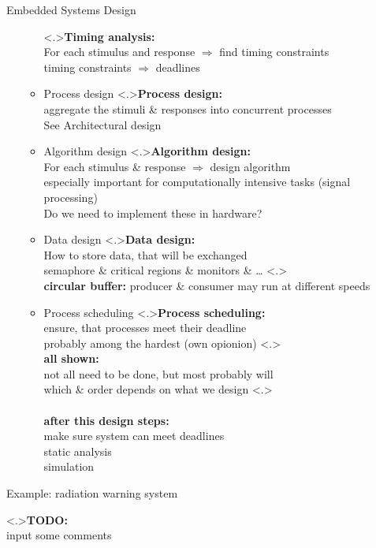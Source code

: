 \documentclass[ngerman={babel}, utf8, bigger, t, xcolor={table,dvipsnames}, ompress, hyperref={bookmarks,colorlinks}]{beamer}
\begin{document}
\begin{frame}{Embedded Systems Design}
\begin{itemize}
\begin{itemize}
			\note<.>{\textbf{Timing analysis:}\\ For each stimulus and response $\Rightarrow$ find timing constraints \\ timing constraints $\Rightarrow$ deadlines}
			\item Process design
			\note<.>{\textbf{Process design:}\\ aggregate the stimuli \& responses into concurrent processes \\
			See Architectural design}
			\item Algorithm design
			\note<.>{\textbf{Algorithm design:}\\ For each stimulus \& response $\Rightarrow$ design algorithm \\ especially important for computationally intensive tasks (signal processing) \\ Do we need to implement these in hardware?}
			\item Data design
			\note<.>{\textbf{Data design:}\\ How to store data, that will be exchanged \\ semaphore \& critical regions \& monitors \& \dots}
			\note<.>{\\ \textbf{circular buffer:} producer \& consumer may run at different speeds}
			\item Process scheduling
			\note<.>{\textbf{Process scheduling:}\\ ensure, that processes meet their deadline \\ probably among the hardest (own opionion)}
			\note<.>{\ \\ \textbf{all shown:}\\ not all need to be done, but most probably will \\ which \& order depends on what we design }
			\note<.>{\\ \ \\ \textbf{after this design steps:}\\ make sure system can meet deadlines \\ static analysis \\ simulation
			}
		\end{itemize}
	\end{itemize}
\end{frame}

\begin{frame}{Example: radiation warning system}
	
	{\textbf{TODO:}\\ input some comments}
\end{frame}
\end{document}
